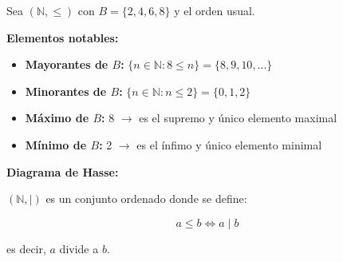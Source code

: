 \documentclass[a4paper,12pt]{article}
\begin{document}
\begin{ejemplo}[title=Ejemplo 1: Orden Usual]
Sea \((\mathbb{N}, \le)\) con \(B = \{2,4,6,8\}\) y el orden usual.

\textbf{Elementos notables:}
\begin{itemize}
    \item \textbf{Mayorantes de \(B\):} \(\{ n \in \mathbb{N} : 8 \le n \} = \{8,9,10,\dots\}\)
    \item \textbf{Minorantes de \(B\):} \(\{ n \in \mathbb{N} : n \le 2 \} = \{0,1,2\}\)
    \item \textbf{Máximo de \(B\):} 8 \(\rightarrow\) es el supremo y único elemento maximal
    \item \textbf{Mínimo de \(B\):} 2 \(\rightarrow\) es el ínfimo y único elemento minimal
\end{itemize}

\textbf{Diagrama de Hasse:}

\begin{center}
\end{center}
\end{ejemplo}

\begin{procedimiento}[title=Relación de Divisibilidad en \(\mathbb{N}\)]
\((\mathbb{N}, |)\) es un conjunto ordenado donde se define:

\[
a \le b \iff a \mid b
\]

es decir, \(a\) divide a \(b\).
\end{procedimiento}
\end{document}
